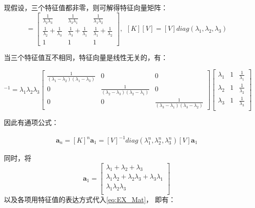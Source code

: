 \documentclass[UTF8,zihao=5]{ctexart}
\newcommand{\bm}[1]{{\mathbf{#1}}}
\begin{document}
现假设，三个特征值都非零，则可解得特征向量矩阵：
\begin{equation}
    [V]=\begin{bmatrix}
        \frac{1}{\lambda_2\lambda_3}            &
        \frac{1}{\lambda_3\lambda_1}            &
        \frac{1}{\lambda_1\lambda_2}                    \\
        \frac{1}{\lambda_2}+\frac{1}{\lambda_3} &
        \frac{1}{\lambda_3}+\frac{1}{\lambda_1} &
        \frac{1}{\lambda_1}+\frac{1}{\lambda_2}         \\
        1                                       & 1 & 1
    \end{bmatrix},\ \ [K][V]=[V]diag(\lambda_1,\lambda_2,\lambda_3)
\end{equation}

当三个特征值互不相同，特征向量是线性无关的，有：

\begin{equation}
    [V]^{-1}=\lambda_1\lambda_2\lambda_3
    \begin{bmatrix}
        \frac{1}{(\lambda_1-\lambda_2)(\lambda_1-\lambda_3)}
          & 0 & 0 \\
        0 &
        \frac{1}{(\lambda_2-\lambda_3)(\lambda_2-\lambda_1)}
          & 0     \\
        0 & 0 &
        \frac{1}{(\lambda_3-\lambda_1)(\lambda_3-\lambda_2)}
    \end{bmatrix}\begin{bmatrix}
        \lambda_1 & 1 & \frac{1}{\lambda_1} \\
        \lambda_2 & 1 & \frac{1}{\lambda_2} \\
        \lambda_3 & 1 & \frac{1}{\lambda_3} \\
    \end{bmatrix}
\end{equation}

因此有通项公式：

\begin{equation}
    \begin{aligned}
        \bm{a}_n=[K]^n\bm{a}_1
        =[V]^{-1}diag(\lambda_1^n,\lambda_2^n,\lambda_3^n)[V]\bm{a}_1
    \end{aligned}
    \label{eq:EX_Mat}
\end{equation}

同时，将
$$
    \bm{a}_1=\begin{bmatrix}
        \lambda_1+\lambda_2+\lambda_3                            \\
        \lambda_1\lambda_2+\lambda_2\lambda_3+\lambda_3\lambda_1 \\
        \lambda_1\lambda_2\lambda_3                              \\
    \end{bmatrix}
$$
以及各项用特征值的表达方式代入\eqref{eq:EX_Mat}，
即有：
\end{document}

